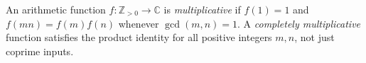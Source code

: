 
An arithmetic function $f:\mathbb Z_{>0}\to\mathbb C$ is \emph{multiplicative} if $f(1)=1$ and $f(mn)=f(m)f(n)$ whenever $\gcd(m,n)=1$. A \emph{completely multiplicative} function satisfies the product identity for all positive integers $m,n$, not just coprime inputs.
